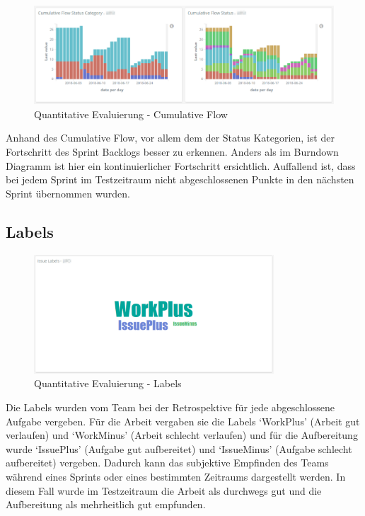 \begin{savenotes}
    \begin{figure}[H]
      \centering
      \includegraphics[width=1.0\textwidth]{img/eval-cumulative.png}
      \caption{Quantitative Evaluierung {-} Cumulative Flow}\label{fig:eval_cumulative}
    \end{figure}
\end{savenotes}

Anhand des Cumulative Flow, vor allem dem der Status Kategorien, ist der Fortschritt des Sprint Backlogs besser zu erkennen.
Anders als im Burndown Diagramm ist hier ein kontinuierlicher Fortschritt ersichtlich.
Auffallend ist, dass bei jedem Sprint im Testzeitraum nicht abgeschlossenen Punkte in den nächsten Sprint übernommen wurden.

\clearpage
\subsection*{Labels}

\begin{savenotes}
    \begin{figure}[H]
      \centering
      \includegraphics[width=0.8\textwidth]{img/eval-labels.png}
      \caption{Quantitative Evaluierung {-} Labels}\label{fig:eval_labels}
    \end{figure}
\end{savenotes}

Die Labels wurden vom Team bei der Retrospektive für jede abgeschlossene Aufgabe vergeben.
Für die Arbeit vergaben sie die Labels `WorkPlus' (Arbeit gut verlaufen) und `WorkMinus' (Arbeit schlecht verlaufen) und für die Aufbereitung wurde `IssuePlus' (Aufgabe gut aufbereitet) und `IssueMinus' (Aufgabe schlecht aufbereitet) vergeben.
Dadurch kann das subjektive Empfinden des Teams während eines Sprints oder eines bestimmten Zeitraums dargestellt werden.
In diesem Fall wurde im Testzeitraum die Arbeit als durchwegs gut und die Aufbereitung als mehrheitlich gut empfunden.

